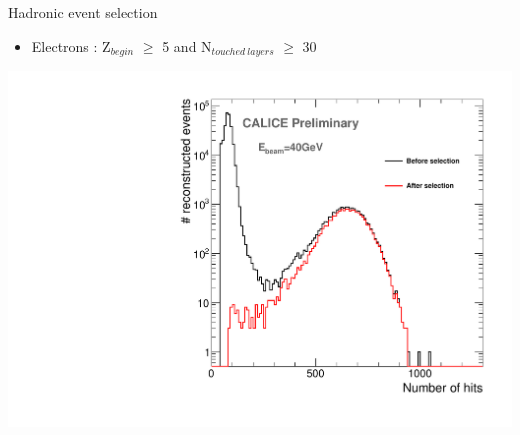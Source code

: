 \documentclass[8pt]{beamer}
\begin{document}
\begin{frame}
\begin{minipage}{0.6\linewidth}
\begin{block}{Hadronic event selection}
\begin{itemize}
          \item Electrons : Z$_{begin}$ $\geq$ 5 and N$_{touched~layers}$ $\geq$ 30
        \end{itemize}
      \end{block}
    \end{minipage} \hfill
    \begin{minipage}{0.38\linewidth}
      \includegraphics[width=\linewidth]{sdhcal_hadron_selection_40GeV.pdf}
    \end{minipage}
  \end{frame}
  
\end{document}

